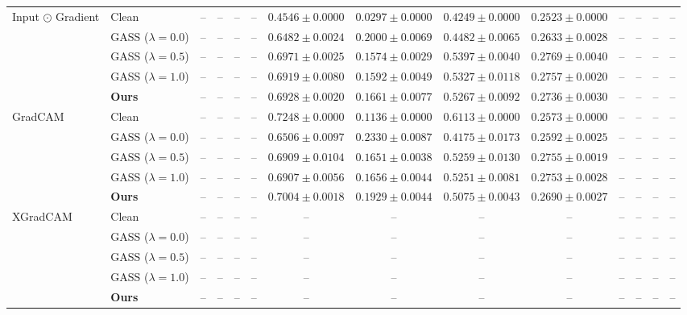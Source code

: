 \begin{table}[t]
{\begin{tabular}{ll|cccc|cccc|cccc}
\multirow{5}{*}{Input $\odot$ Gradient}
& Clean & -- & -- & -- & -- & $0.4546 \pm 0.0000$ & $\mathbf{0.0297 \pm 0.0000}$ & $0.4249 \pm 0.0000$ & $0.2523 \pm 0.0000$ & -- & -- & -- & -- \\
& GASS ($\lambda=0.0$) & -- & -- & -- & -- & $0.6482 \pm 0.0024$ & $0.2000 \pm 0.0069$ & $0.4482 \pm 0.0065$ & $0.2633 \pm 0.0028$ & -- & -- & -- & -- \\
& GASS ($\lambda=0.5$) & -- & -- & -- & -- & $\mathbf{0.6971 \pm 0.0025}$ & $0.1574 \pm 0.0029$ & $\mathbf{0.5397 \pm 0.0040}$ & $\mathbf{0.2769 \pm 0.0040}$ & -- & -- & -- & -- \\
& GASS ($\lambda=1.0$) & -- & -- & -- & -- & $0.6919 \pm 0.0080$ & $0.1592 \pm 0.0049$ & $0.5327 \pm 0.0118$ & $0.2757 \pm 0.0020$ & -- & -- & -- & -- \\
& \textbf{Ours} & -- & -- & -- & -- & $0.6928 \pm 0.0020$ & $0.1661 \pm 0.0077$ & $0.5267 \pm 0.0092$ & $0.2736 \pm 0.0030$ & -- & -- & -- & -- \\
\midrule

\multirow{5}{*}{GradCAM}
& Clean & -- & -- & -- & -- & $\mathbf{0.7248 \pm 0.0000}$ & $\mathbf{0.1136 \pm 0.0000}$ & $\mathbf{0.6113 \pm 0.0000}$ & $0.2573 \pm 0.0000$ & -- & -- & -- & -- \\
& GASS ($\lambda=0.0$) & -- & -- & -- & -- & $0.6506 \pm 0.0097$ & $0.2330 \pm 0.0087$ & $0.4175 \pm 0.0173$ & $0.2592 \pm 0.0025$ & -- & -- & -- & -- \\
& GASS ($\lambda=0.5$) & -- & -- & -- & -- & $0.6909 \pm 0.0104$ & $0.1651 \pm 0.0038$ & $0.5259 \pm 0.0130$ & $\mathbf{0.2755 \pm 0.0019}$ & -- & -- & -- & -- \\
& GASS ($\lambda=1.0$) & -- & -- & -- & -- & $0.6907 \pm 0.0056$ & $0.1656 \pm 0.0044$ & $0.5251 \pm 0.0081$ & $0.2753 \pm 0.0028$ & -- & -- & -- & -- \\
& \textbf{Ours} & -- & -- & -- & -- & $0.7004 \pm 0.0018$ & $0.1929 \pm 0.0044$ & $0.5075 \pm 0.0043$ & $0.2690 \pm 0.0027$ & -- & -- & -- & -- \\
\midrule

\multirow{5}{*}{XGradCAM}
& Clean & -- & -- & -- & -- & -- & -- & -- & -- & -- & -- & -- & -- \\
& GASS ($\lambda=0.0$) & -- & -- & -- & -- & -- & -- & -- & -- & -- & -- & -- & -- \\
& GASS ($\lambda=0.5$) & -- & -- & -- & -- & -- & -- & -- & -- & -- & -- & -- & -- \\
& GASS ($\lambda=1.0$) & -- & -- & -- & -- & -- & -- & -- & -- & -- & -- & -- & -- \\
& \textbf{Ours} & -- & -- & -- & -- & -- & -- & -- & -- & -- & -- & -- & -- \\


\end{tabular}}
\end{table}

